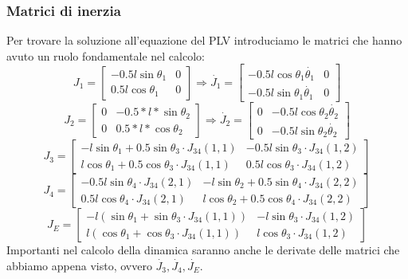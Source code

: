 \subsubsection{Matrici di inerzia}
Per trovare la soluzione all'equazione del PLV introduciamo le matrici che hanno avuto un ruolo fondamentale nel calcolo:
\begin{equation*}
    J_1 = \begin{bmatrix}
     -0.5l\sin\theta_1 & 0 \\ 0.5l\cos\theta_1 & 0
    \end{bmatrix} \Rightarrow
    \dot{J_1} = \begin{bmatrix}
     -0.5l\cos\theta_1\dot{\theta_1} & 0 \\ -0.5l\sin\theta_1\dot{\theta_1} & 0
    \end{bmatrix}
\end{equation*}
\begin{equation*}
    J_2 = \begin{bmatrix}
           0 & -0.5*l*\sin\theta_2 \\
           0 & 0.5*l*\cos\theta_2 
           \end{bmatrix}
           \Rightarrow
   \dot{J_2} = \begin{bmatrix} 0 & -0.5l\cos\theta_2\dot{\theta_2} \\
           0 & -0.5l\sin\theta_2\dot{\theta_2}
           \end{bmatrix}
\end{equation*}
\begin{equation*}
    J_3 = \begin{bmatrix}
    -l\sin\theta_1+0.5\sin\theta_3\cdot J_{34}(1,1) & 
    -0.5l\sin\theta_3\cdot J_{34}(1,2) \\
    l\cos\theta_1+0.5\cos\theta_3\cdot J_{34}(1,1) & 
    0.5l\cos\theta_3\cdot J_{34}(1,2)
    \end{bmatrix}
\end{equation*}
\begin{equation*}
    J_4 = \begin{bmatrix}
    -0.5l\sin\theta_4\cdot J_{34}(2,1) &
    -l\sin\theta_2+0.5\sin\theta_4\cdot J_{34}(2,2) \\
    0.5l\cos\theta_4\cdot J_{34}(2,1) &
    l\cos\theta_2+0.5\cos\theta_4\cdot J_{34}(2,2)
    \end{bmatrix}
\end{equation*}
\begin{equation*}
    J_E = \begin{bmatrix}
    -l(\sin\theta_1+\sin\theta_3\cdot J_{34}(1,1)) & 
    -l\sin\theta_3 \cdot J_{34}(1,2) \\
    l(\cos\theta_1+\cos\theta_3\cdot J_{34}(1,1)) &
    l\cos\theta_3 \cdot J_{34}(1,2)
    \end{bmatrix}
\end{equation*} 
Importanti nel calcolo della dinamica saranno anche le derivate delle matrici che abbiamo appena visto, ovvero $\dot{J_3}, \dot{J_4}, \dot{J_E}$. 
